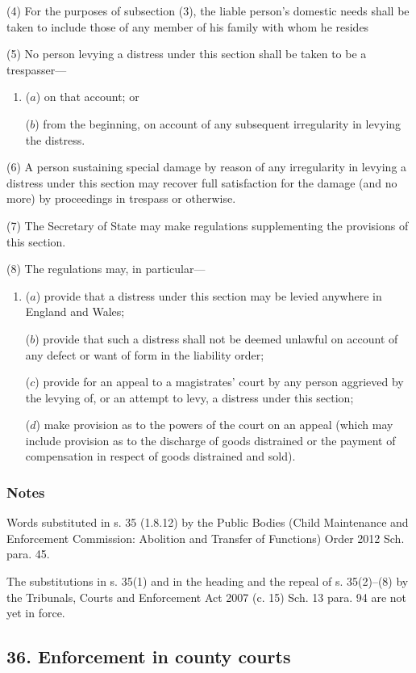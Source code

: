 \documentclass[a4paper]{article}
\newcommand\amendment[1]{\subsubsection*{Notes}{\itshape\frenchspacing\footnotesize #1 \par}}
\begin{document}
(4) For the purposes of subsection (3), the liable person’s domestic needs shall be 
taken to include those of any member of his family with whom he resides

(5) No person levying a distress under this section shall be taken to be a trespasser---
\begin{enumerate}\item[]
 ($a$) on that account; or 

($b$) from the beginning, on account of any subsequent irregularity in levying the distress.
\end{enumerate}

(6) A person sustaining special damage by reason of any irregularity in levying a distress under this section may recover full satisfaction for the damage (and no more) by proceedings in trespass or otherwise.

(7) The Secretary of State may make regulations supplementing the provisions of this section.

(8) The regulations may, in particular---
\begin{enumerate}\item[]
 ($a$) provide that a distress under this section may be levied anywhere in England and Wales;

($b$) provide that such a distress shall not be deemed unlawful on account of any defect or want of form in the liability order;

($c$) provide for an appeal to a magistrates’ court by any person aggrieved by the levying of, or an attempt to levy, a distress under this section;

($d$) make provision as to the powers of the court on an appeal (which may include provision as to the discharge of goods distrained or the payment of compensation in respect of goods distrained and sold).
\end{enumerate}

\amendment{

Words substituted in s. 35 (1.8.12) by the Public Bodies (Child Maintenance and Enforcement Commission: Abolition and Transfer of Functions) Order 2012 Sch. para. 45.

The substitutions in s. 35(1) and in the heading and the repeal of s. 35(2)--(8) by the Tribunals, Courts and Enforcement Act 2007 (c. 15) Sch. 13 para. 94 are not yet in force.

}

\subsection{36. Enforcement in county courts}
\end{document}
